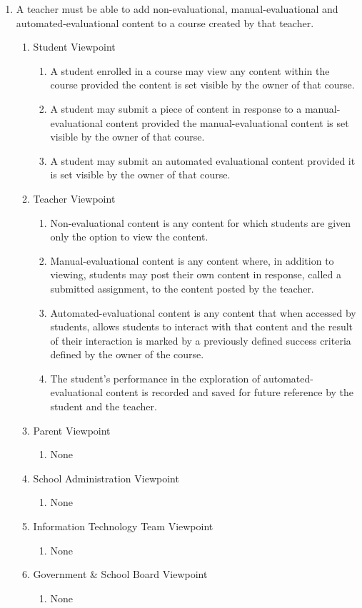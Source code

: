 \documentclass[]{article}
\begin{document}
\begin{enumerate}[{BE}1.]
	\item A teacher must be able to add non-evaluational, manual-evaluational and 
automated-evaluational content to a course created by that teacher.
	\begin{enumerate}[{VP1}.1]
		\item Student Viewpoint
			\begin{enumerate}
				\item A student enrolled in a course may view any content within the course 
provided the content is set visible by the owner of that course.
				\item A student may submit a piece of content in response to a 
manual-evaluational content provided the manual-evaluational content is set 
visible by the owner of that course.
				\item A student may submit an automated evaluational content provided it is 
set visible by the owner of that course.
			\end{enumerate}
		\item Teacher Viewpoint
			\begin{enumerate}
				\item Non-evaluational content is any content for which students are given 
only the option to view the content.
				\item Manual-evaluational content is any content where, in addition to 
viewing, students may post their own content in response, called a submitted 
assignment, to the content posted by the teacher.
				\item Automated-evaluational content is any content that when accessed by 
students, allows students to interact with that content and the result of their 
interaction is marked by a previously defined success criteria defined by the 
owner of the course.
				\item The student's performance in the exploration of automated-evaluational 
content is recorded and saved for future reference by the student and the 
teacher.
			\end{enumerate}
		\item Parent Viewpoint
			\begin{enumerate}
				\item None
			\end{enumerate}
		\item School Administration Viewpoint
			\begin{enumerate}
				\item None
			\end{enumerate}
		\item Information Technology Team Viewpoint
			\begin{enumerate}
				\item None
			\end{enumerate}
		\item Government \& School Board Viewpoint
			\begin{enumerate}
				\item None
			\end{enumerate}
	\end{enumerate}


\end{enumerate}
\end{document}
